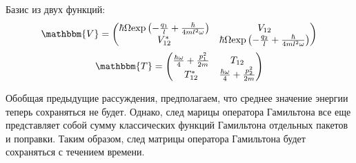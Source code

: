 Базис из двух функций:
$$\mathbbm{V} = \left( \begin{matrix} %
		\hbar\Omega\myexp{-\frac{q_1}{l}+\frac{\hbar}{4ml^2\omega}} & %
		V_{12} \\ %
		V_{12}^* & %
		\hbar\Omega\myexp{-\frac{q_2}{l}+\frac{\hbar}{4ml^2\omega}} \\ %
		\end{matrix} \right)$$
$$\mathbbm{T} = \left( \begin{matrix} %
		       \frac{\hbar\omega}{4}+\frac{p_1^2}{2m} & %
		       T_{12} \\ %
		       T_{12}^* & %
		       \frac{\hbar\omega}{4}+\frac{p_2^2}{2m} %
		       \end{matrix} \right)$$

Обобщая предыдущие рассуждения, предполагаем, 
что среднее значение энергии теперь сохраняться не будет. 
Однако, след марицы оператора Гамильтона все еще представляет собой сумму классических функций 
Гамильтона отдельных пакетов и поправки. 
Таким образом, след матрицы оператора Гамильтона будет сохраняться с течением времени.

